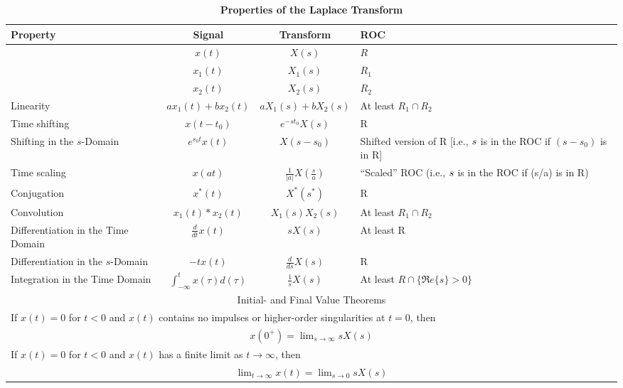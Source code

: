 \documentclass[12pt]{article}
\newcommand{\R}{\mbox{$\Re e\{s\}$}}
\begin{document}
%
%

\begin{table}[htbp]
	\begin{center}
		\vspace*{-1.0in}
		
		\caption{\bf Properties of the Laplace Transform}
		\hspace*{-1.0in}
		\renewcommand{\arraystretch}{2}
		\begin{tabular}{l|c|c|p{2in}}
			{\bf Property} & {\bf Signal} & {\bf Transform} &{ \bf ROC}
			\vspace*{-3ex}\\
			\hline
			&$x(t)$ &$X(s)$ & $R$ \\
			&$x_{1}(t)$ &$X_{1}(s)$ & $R_{1}$ \\
			&$x_{2}(t)$ &$X_{2}(s)$ & $R_{2}$ \\
			Linearity &$ax_{1}(t) + bx_{2}(t)$&$aX_{1}(s) +
			bX_{2}(s)$ &At least $R_{1} \cap R_{2}$ \\
			Time shifting                          %
			&$x(t-t_{0})$ & $e^{-st_{0}}X(s)$ &R \\
			Shifting in the $s$-Domain                          %
			&$e^{s_{0}t}x(t)$ & $X(s-s_{0})$
			& Shifted version of R [i.e., $s\/$ is in the
			ROC if $(s-s_{0})$ is in R] \\
			Time scaling                          %
			&$x(at)$
			&$\displaystyle\frac{1}{|a|}X\left(
			\displaystyle\frac{s}{a}
			\right)$ & ``Scaled'' ROC (i.e., $s\/$ is in
			the ROC if (s/a) is in R) \\
			Conjugation                         %
			& \(x^* (t)\) & \(X^* (s^*)\) & R
			\\
			Convolution                          %
			&$x_{1}(t) \ast x_{2}(t)$
			&$X_{1}(s)X_{2}(s)$ &At least $R_{1} \cap
			R_{2}$\\
			Differentiation in the Time Domain                          %
			&$\displaystyle\frac{d}{dt}x(t)$
			&$sX(s)$ &At least R \\
			Differentiation in the $s$-Domain                                %
			&$-tx(t)$
			&$\displaystyle\frac{d}{ds}X(s)$ & R \\
			Integration in the Time Domain               %
			&$\displaystyle
			\int_{-\infty}^{t}x(\tau)d(\tau)$
			&$\displaystyle\frac{1}{s}X(s)$ &At least $R \cap \{\R >
			0\}$  \\
			\hline
			\multicolumn{4}{c}{Initial- and Final Value Theorems} \\
			
			\multicolumn{4}{l}{If $x(t)=0$ for $ t < 0$ and $x(t)$ contains no impulses or higher-order singularities at $t=0$, then}  \\
			\multicolumn{4}{c}{$x(0^+) = \lim_{s\to \infty} sX(s)$}\\
			\multicolumn{4}{l}{If $x(t)=0$ for $ t<0$ and $x(t)$ has a finite limit as $ t\to \infty$, then}\\
			\multicolumn{4}{c}{$\lim_{t\to\infty} x(t) = \lim_{s\to 0}sX(s)$}\\
			\hline
		\end{tabular}
	\end{center}
\end{table}
\clearpage
\end{document}
